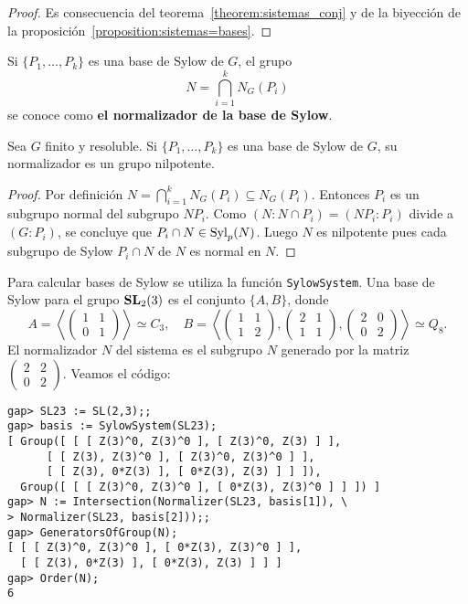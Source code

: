 \begin{proof}
	Es consecuencia del teorema~\ref{theorem:sistemas_conj} y 
	de la biyección de la proposición~\ref{proposition:sistemas=bases}.
\end{proof}

Si $\{P_1,\dots,P_k\}$ es una base de Sylow de $G$,
el grupo
\[
	N=\bigcap_{i=1}^k N_G(P_i)
\]
se conoce como \textbf{el normalizador de la base de Sylow}. 

\begin{theorem}
	Sea $G$ finito y resoluble. Si $\{P_1,\dots,P_k\}$ es una base de Sylow de
	$G$, su normalizador es un grupo nilpotente. 
\end{theorem}

\begin{proof}
	Por definición $N=\bigcap_{i=1}^k N_G(P_i)\subseteq N_G(P_i)$. Entonces
	$P_i$ es un subgrupo normal del subgrupo $NP_i$.  Como $(N:N\cap
	P_i)=(NP_i:P_i)$ divide a $(G:P_i)$, se concluye que $P_i\cap
	N\in\mathrm{Syl}_p(N)$.  Luego $N$ es nilpotente pues cada subgrupo de Sylow $P_i\cap N$ de $N$ es normal en
	$N$.
\end{proof}

\begin{example}
	Para calcular bases de Sylow se utiliza la función \lstinline{SylowSystem}.
	Una base de Sylow para el grupo $\mathbf{SL}_2(3)$ es el conjunto
	$\{A,B\}$, donde 
	\[
	A=\left\langle \begin{pmatrix}
		1 & 1\\
		0 & 1
	\end{pmatrix}\right\rangle\simeq C_3,\quad
	B=\left\langle \begin{pmatrix}
		1 & 1\\
		1 & 2
	\end{pmatrix},
	\begin{pmatrix}
		2 & 1\\
		1 & 1
	\end{pmatrix},
	\begin{pmatrix}
		2 & 0\\
		0 & 2
	\end{pmatrix}\right\rangle\simeq Q_8.
	\]
	El normalizador $N$ del sistema es el subgrupo $N$ generado por
	la matriz $\begin{pmatrix} 2 & 2\\0 & 2\end{pmatrix}$. Veamos el código:
\begin{lstlisting}
gap> SL23 := SL(2,3);;
gap> basis := SylowSystem(SL23);
[ Group([ [ [ Z(3)^0, Z(3)^0 ], [ Z(3)^0, Z(3) ] ], 
      [ [ Z(3), Z(3)^0 ], [ Z(3)^0, Z(3)^0 ] ], 
      [ [ Z(3), 0*Z(3) ], [ 0*Z(3), Z(3) ] ] ]), 
  Group([ [ [ Z(3)^0, Z(3)^0 ], [ 0*Z(3), Z(3)^0 ] ] ]) ]
gap> N := Intersection(Normalizer(SL23, basis[1]), \
> Normalizer(SL23, basis[2]));;
gap> GeneratorsOfGroup(N);
[ [ [ Z(3)^0, Z(3)^0 ], [ 0*Z(3), Z(3)^0 ] ], 
  [ [ Z(3), 0*Z(3) ], [ 0*Z(3), Z(3) ] ] ]
gap> Order(N);
6
\end{lstlisting}
\end{example}

